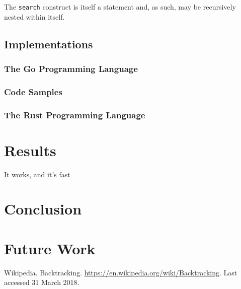 \documentclass[runningheads]{llncs}
\newcommand{\code}[1]{\texttt{#1}}
\begin{document}
The \code{search} construct is itself a statement and, as such, may be recursively nested within itself.

\subsection{Implementations}

\subsubsection{The Go Programming Language}

\subsubsection{Code Samples}

\subsubsection{The Rust Programming Language}



\section{Results}
It works, and it's fast

\section{Conclusion}

\section{Future Work}

\newpage

\begin{thebibliography}{50}
	 Wikipedia. Backtracking. \url{https://en.wikipedia.org/wiki/Backtracking}. Last accessed 31 March 2018.
\end{thebibliography}

\end{document}
